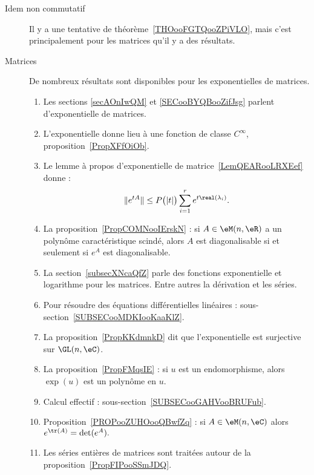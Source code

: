 \begin{description}
    \item[Idem non commutatif]

        Il y a une tentative de théorème~\ref{THOooFGTQooZPiVLO}, mais c'est principalement pour les matrices qu'il y a des résultats.

    \item[Matrices]

        De nombreux résultats sont disponibles pour les exponentielles de matrices.

\begin{enumerate}
    \item
        Les sections \ref{secAOnIwQM} et \ref{SECooBYQBooZifJsg} parlent d'exponentielle de matrices.
    \item
        L'exponentielle donne lieu à une fonction de classe \(  C^{\infty}\), proposition~\ref{PropXFfOiOb}.
    \item
            Le lemme à propos d'exponentielle de matrice~\ref{LemQEARooLRXEef} donne :
            \begin{equation*}
                \|  e^{tA} \|\leq P\big( | t | \big)\sum_{i=1}^r e^{t\real(\lambda_i)}.
            \end{equation*}
        \item
            La proposition~\ref{PropCOMNooIErskN} : si \( A\in \eM(n,\eR)\) a un polynôme caractéristique scindé, alors \( A\) est diagonalisable si et seulement si \( e^A\) est diagonalisable.
\item
    La section~\ref{subsecXNcaQfZ} parle des fonctions exponentielle et logarithme pour les matrices. Entre autres la dérivation et les séries.
\item
    Pour résoudre des équations différentielles linéaires : sous-section~\ref{SUBSECooMDKIooKaaKlZ}.
\item
    La proposition~\ref{PropKKdmnkD} dit que l'exponentielle est surjective sur \( \GL(n,\eC)\).
\item

La proposition~\ref{PropFMqsIE} : si \( u\) est un endomorphisme, alors \( \exp(u)\) est un polynôme en \( u\).
\item
    Calcul effectif : sous-section~\ref{SUBSECooGAHVooBRUFub}.
\item Proposition~\ref{PROPooZUHOooQBwfZq} : si \( A\in\eM(n,\eC)\) alors $ e^{\tr(A)}=\det( e^{A}).$
    \item
        Les séries entières de matrices sont traitées autour de la proposition~\ref{PropFIPooSSmJDQ}.
\end{enumerate}


\end{description}

